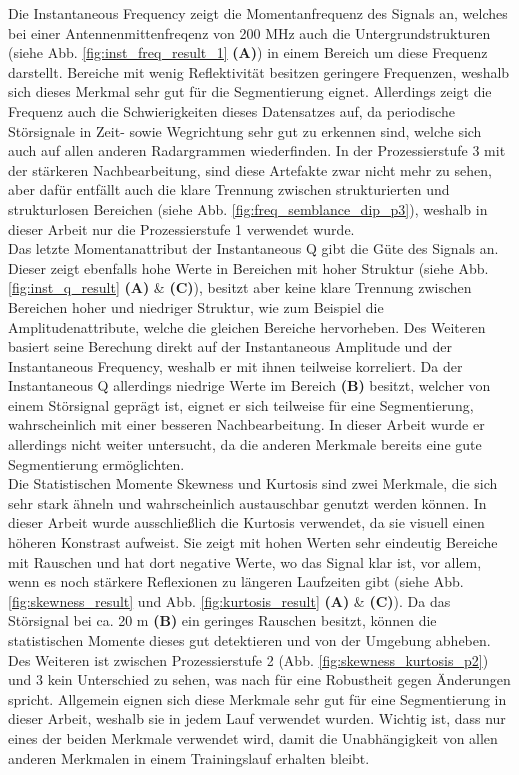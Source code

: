 Die Instantaneous Frequency zeigt die Momentanfrequenz des Signals an, welches bei einer Antennenmittenfreqenz von 200 MHz auch die Untergrundstrukturen (siehe Abb. \ref{fig:inst_freq_result_1} \textbf{(A)}) in einem Bereich um diese Frequenz darstellt. Bereiche mit wenig Reflektivität besitzen geringere Frequenzen, weshalb sich dieses Merkmal sehr gut für die Segmentierung eignet. Allerdings zeigt die Frequenz auch die Schwierigkeiten dieses Datensatzes auf, da periodische Störsignale in Zeit- sowie Wegrichtung sehr gut zu erkennen sind, welche sich auch auf allen anderen Radargrammen wiederfinden. In der Prozessierstufe 3 mit der stärkeren Nachbearbeitung, sind diese Artefakte zwar nicht mehr zu sehen, aber dafür entfällt auch die klare Trennung zwischen strukturierten und strukturlosen Bereichen (siehe Abb. \ref{fig:freq_semblance_dip_p3}), weshalb in dieser Arbeit nur die Prozessierstufe 1 verwendet wurde.\\
Das letzte Momentanattribut der Instantaneous Q gibt die Güte des Signals an. Dieser zeigt ebenfalls hohe Werte in Bereichen mit hoher Struktur (siehe Abb. \ref{fig:inst_q_result} \textbf{(A)} \& \textbf{(C)}), besitzt aber keine klare Trennung zwischen Bereichen hoher und niedriger Struktur, wie zum Beispiel die Amplitudenattribute, welche die gleichen Bereiche hervorheben. Des Weiteren basiert seine Berechung direkt auf der Instantaneous Amplitude und der Instantaneous Frequency, weshalb er mit ihnen teilweise korreliert. Da der Instantaneous Q allerdings niedrige Werte im Bereich \textbf{(B)} besitzt, welcher von einem Störsignal geprägt ist, eignet er sich teilweise für eine Segmentierung, wahrscheinlich mit einer besseren Nachbearbeitung. In dieser Arbeit wurde er allerdings nicht weiter untersucht, da die anderen Merkmale bereits eine gute Segmentierung ermöglichten.\\
Die Statistischen Momente Skewness und Kurtosis sind zwei Merkmale, die sich sehr stark ähneln und wahrscheinlich austauschbar genutzt werden können. In dieser Arbeit wurde ausschließlich die Kurtosis verwendet, da sie visuell einen höheren Konstrast aufweist. Sie zeigt mit hohen Werten sehr eindeutig Bereiche mit Rauschen und hat dort negative Werte, wo das Signal klar ist, vor allem, wenn es noch stärkere Reflexionen zu längeren Laufzeiten gibt (siehe Abb. \ref{fig:skewness_result} und Abb. \ref{fig:kurtosis_result} \textbf{(A)} \& \textbf{(C)}). Da das Störsignal bei ca. 20 m \textbf{(B)} ein geringes Rauschen besitzt, können die statistischen Momente dieses gut detektieren und von der Umgebung abheben. Des Weiteren ist zwischen Prozessierstufe 2 (Abb. \ref{fig:skewness_kurtosis_p2}) und 3 kein Unterschied zu sehen, was nach \textcite{barnes_too_2006} für eine Robustheit gegen Änderungen spricht. Allgemein eignen sich diese Merkmale sehr gut für eine Segmentierung in dieser Arbeit, weshalb sie in jedem Lauf verwendet wurden. Wichtig ist, dass nur eines der beiden Merkmale verwendet wird, damit die Unabhängigkeit von allen anderen Merkmalen in einem Trainingslauf erhalten bleibt.\\
